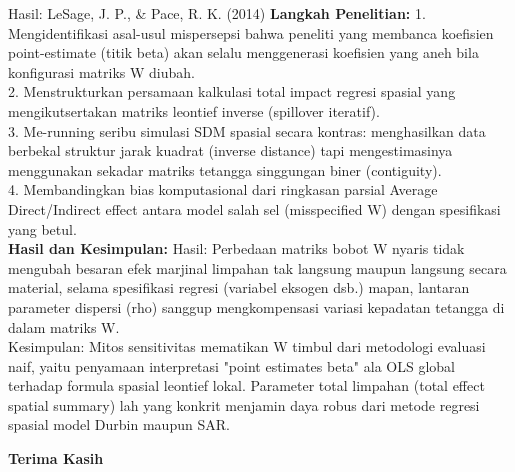 \documentclass{beamer}
\begin{document}
\begin{frame}[allowframebreaks]{Hasil: LeSage, J. P., \& Pace, R. K. (2014)}
\textbf{Langkah Penelitian:} 1. Mengidentifikasi asal-usul mispersepsi bahwa peneliti yang membanca koefisien point-estimate (titik beta) akan selalu menggenerasi koefisien yang aneh bila konfigurasi matriks W diubah.\\ 2. Menstrukturkan persamaan kalkulasi total impact regresi spasial yang mengikutsertakan matriks leontief inverse (spillover iteratif).\\ 3. Me-running seribu simulasi SDM spasial secara kontras: menghasilkan data berbekal struktur jarak kuadrat (inverse distance) tapi mengestimasinya menggunakan sekadar matriks tetangga singgungan biner (contiguity).\\ 4. Membandingkan bias komputasional dari ringkasan parsial Average Direct/Indirect effect antara model salah sel (misspecified W) dengan spesifikasi yang betul. \\[0.3cm]
\textbf{Hasil dan Kesimpulan:} Hasil: Perbedaan matriks bobot W nyaris tidak mengubah besaran efek marjinal limpahan tak langsung maupun langsung secara material, selama spesifikasi regresi (variabel eksogen dsb.) mapan, lantaran parameter dispersi (rho) sanggup mengkompensasi variasi kepadatan tetangga di dalam matriks W.\\ Kesimpulan: Mitos sensitivitas mematikan W timbul dari metodologi evaluasi naif, yaitu penyamaan interpretasi "point estimates beta" ala OLS global terhadap formula spasial leontief lokal. Parameter total limpahan (total effect spatial summary) lah yang konkrit menjamin daya robus dari metode regresi spasial model Durbin maupun SAR.
\end{frame}


\begin{frame}
    \centering
    \Huge \textbf{Terima Kasih}
\end{frame}
\end{document}

